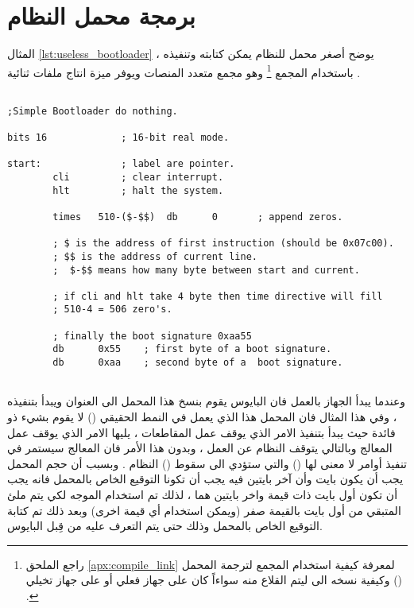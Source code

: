 \documentclass[document.tex]{subfiles}
\begin{document}
\section{برمجة محمل النظام}
المثال \ref{lst:useless_bootloader} يوضح أصغر محمل للنظام يمكن كتابته وتنفيذه ، باستخدام المجمع \footnote{راجع الملحق \ref{apx:compile_link} لمعرفة كيفية استخدام المجمع لترجمة المحمل وكيفية نسخه الى  ليتم القلاع منه سواءاً كان على جهاز فعلي أو على جهاز تخيلي () .} وهو مجمع متعدد المنصات ويوفر ميزة انتاج ملفات ثنائية  .\\

%

\begin{english}


\label{lst:useless_bootloade}
\lstset{numberstyle=\tiny,numbers=left,stepnumber=1,numbersep=5pt,tabsize=2,extendedchars=true,breaklines=true,frame=b,showspaces=false, showtabs=false,xleftmargin=10pt,framexleftmargin=10pt,framexrightmargin=5pt,framexbottommargin=4pt,showstringspaces=false,language=[x86masm]Assembler}

\begin{lstlisting}[label=lst:useless_bootloader,caption=\en{Smallest Bootloader}]

;Simple Bootloader do nothing.

bits 16				; 16-bit real mode.

start:				; label are pointer.
		cli			; clear interrupt.		
		hlt			; halt the system.
		
		times	510-($-$$)	db		0		; append zeros.
		
		; $ is the address of first instruction (should be 0x07c00).
		; $$ is the address of current line.
		;  $-$$ means how many byte between start and current.
		
		; if cli and hlt take 4 byte then time directive will fill
		; 510-4 = 506 zero's.
		
		; finally the boot signature 0xaa55
		db		0x55	; first byte of a boot signature.
		db		0xaa	; second byte of a  boot signature.
		
\end{lstlisting}
\end{english}

وعندما يبدأ الجهاز بالعمل فان البايوس يقوم بنسخ هذا المحمل الى العنوان  ويبدأ بتنفيذه ، وفي هذا المثال فان المحمل هذا الذي يعمل في النمط الحقيقي () لا يقوم بشيء ذو فائدة حيث يبدأ بتنفيذ الامر  الذي يوقف عمل المقاطعات ، يليها الامر  الذي يوقف عمل المعالج وبالتالي يتوقف النظام عن العمل ، وبدون هذا الأمر فان المعالج سيستمر في تنفيذ أوامر لا معنى لها () والتي ستؤدي الى سقوط () النظام .  
وبسبب أن حجم المحمل يجب أن يكون  بايت وأن آخر بايتين فيه يجب أن تكونا التوقيع الخاص بالمحمل فانه يجب أن تكون أول  بايت ذات قيمة واخر بايتين هما  ، لذلك تم استخدام الموجه  لكي يتم ملئ المتبقي من أول  بايت بالقيمة صفر (ويمكن استخدام أي قيمة اخرى) وبعد ذلك تم كتابة التوقيع الخاص بالمحمل وذلك حتى يتم التعرف عليه من قِبل البايوس.
\end{document}
